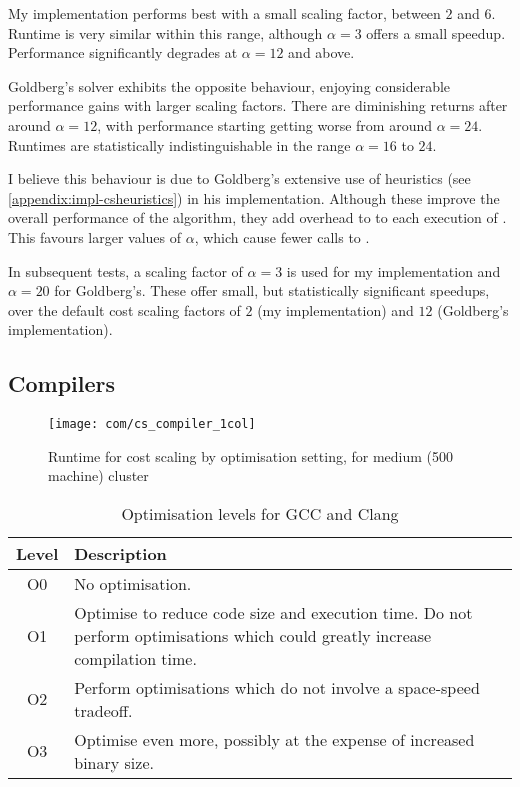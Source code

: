 My implementation performs best with a small scaling factor, between $2$ and $6$. Runtime is very similar within this range, although $\alpha=3$ offers a small speedup. Performance significantly degrades at $\alpha = 12$ and above.

Goldberg's solver exhibits the opposite behaviour, enjoying considerable performance gains with larger scaling factors. There are diminishing returns after around $\alpha = 12$, with performance starting getting worse from around $\alpha = 24$. Runtimes are statistically indistinguishable in the range $\alpha=16$ to $24$.

I believe this behaviour is due to Goldberg's extensive use of heuristics (see \cref{appendix:impl-csheuristics}) in his implementation. Although these improve the overall performance of the algorithm, they add overhead to to each execution of . This favours larger values of $\alpha$, which cause fewer calls to . 

In subsequent tests, a scaling factor of $\alpha = 3$ is used for my implementation and $\alpha = 20$ for Goldberg's. These offer small, but statistically significant speedups, over the default cost scaling factors of $2$ (my implementation) and $12$ (Goldberg's implementation).

\subsection{Compilers} \label{sec:eval-optimisations-compilers}

\begin{figure}
    \texttt{[image: com/cs\_compiler\_1col]}
    \caption{Runtime for cost scaling by optimisation setting, for medium (500 machine) cluster}
    \label{fig:compiler-settings}
\end{figure}

\begin{table}
    \centering
    \begin{tabular}{cp{}}
        \textbf{Level} & \textbf{Description}\tabularnewline
        \hline
        O0 & No optimisation. \tabularnewline
        O1 & Optimise to reduce code size and execution time. Do not perform optimisations which could greatly increase compilation time. \tabularnewline
        O2 & Perform optimisations which do not involve a space-speed tradeoff. \tabularnewline 
        O3 & Optimise even more, possibly at the expense of increased binary size. \tabularnewline
    \end{tabular}
    \caption{Optimisation levels for GCC and Clang}
    \label{table:optimisation-flags}
\end{table}

